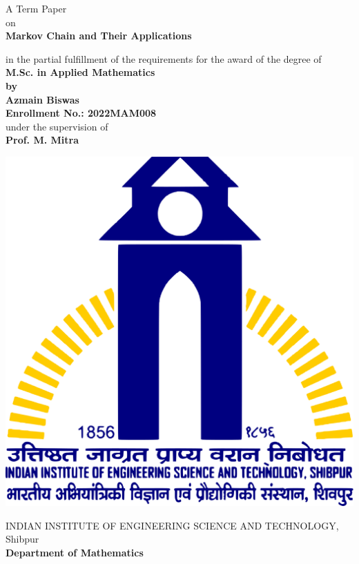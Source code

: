 \begin{titlepage}
    \thispagestyle{empty}
    \begin{center}

        \vspace{3cm}

        \Large{A Term Paper\\ on}\\
        \vspace{1cm}
        \huge{\textbf{Markov Chain and Their Applications}}

        \vspace{2cm}

        \large{{in the partial fulfillment of the requirements for the award of the degree of}}\\
        \Large{\textbf{M.Sc. in Applied Mathematics}}\\ 
        \large{\textbf{by}}\\ 
        \Large{\textbf{Azmain Biswas}}\\ 
        \Large{\textbf{Enrollment No.: 2022MAM008}}\\ 
        \Large{under the supervision of}\\ 
        \Large{\textbf{Prof. M. Mitra}}

        \vspace{3cm}

        \includegraphics[scale = 0.09]{pic/IIEST_Shibpur_Logo.svg.png}

        \vspace{2cm}

        \Large{{
                INDIAN INSTITUTE OF ENGINEERING SCIENCE AND TECHNOLOGY, Shibpur\\ 
                \textbf{Department of Mathematics}
        }}
    \end{center}
\end{titlepage}
